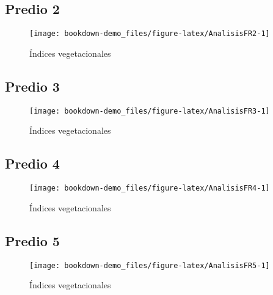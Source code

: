 \documentclass[]{report}
\begin{document}
\subsection{Predio 2}\label{predio-2-2}

\begin{figure}

{\centering \texttt{[image: bookdown-demo\_files/figure-latex/AnalisisFR2-1]} 

}

\caption{Índices vegetacionales}\label{fig:AnalisisFR2}
\end{figure}

\subsection{Predio 3}\label{predio-3-2}

\begin{figure}

{\centering \texttt{[image: bookdown-demo\_files/figure-latex/AnalisisFR3-1]} 

}

\caption{Índices vegetacionales}\label{fig:AnalisisFR3}
\end{figure}

\subsection{Predio 4}\label{predio-4-2}

\begin{figure}

{\centering \texttt{[image: bookdown-demo\_files/figure-latex/AnalisisFR4-1]} 

}

\caption{Índices vegetacionales}\label{fig:AnalisisFR4}
\end{figure}

\subsection{Predio 5}\label{predio-5-2}

\begin{figure}

{\centering \texttt{[image: bookdown-demo\_files/figure-latex/AnalisisFR5-1]} 

}

\caption{Índices vegetacionales}\label{fig:AnalisisFR5}
\end{figure}


\end{document}
